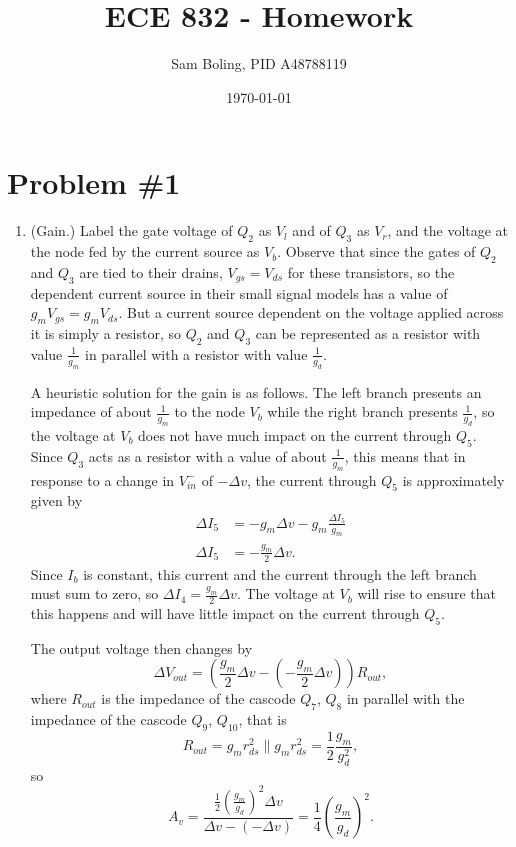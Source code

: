 \documentclass{article}
\title{ECE 832 - Homework}
\author{Sam Boling, PID A48788119}
\date{\today}
\begin{document}
\maketitle

\section*{Problem \#1}

\begin{enumerate}
\item{ (Gain.)
Label the gate voltage of $Q_2$ as $V_l$ and of $Q_3$ as $V_r$, and the
voltage at the node fed by the current source as $V_b$. Observe that since
the gates of $Q_2$ and $Q_3$ are tied to their drains, $V_{gs} = V_{ds}$ for
these transistors, so the dependent current source in their small signal models
has a value of $g_m V_{gs} = g_m V_{ds}$. But a current source dependent on the
voltage applied across it is simply a resistor, so $Q_2$ and $Q_3$ can be 
represented as a resistor with value $\frac{1}{g_m}$ in parallel with a 
resistor with value $\frac{1}{g_d}$.

A heuristic solution for the gain is as follows. The left branch presents an
impedance of about $\frac{1}{g_m}$ to the node $V_{b}$ while the right branch
presents $\frac{1}{g_d}$, so the voltage at $V_{b}$ does not have much impact
on the current through $Q_5$. Since $Q_3$ acts as a resistor with a value of
about $\frac{1}{g_m}$, this means that in response to a change in $V_{in}^{-}$
of $-\Delta v$, the current through $Q_5$ is approximately given by
\begin{align*}
\Delta I_5 &= -g_m \Delta v - g_m \frac{\Delta I_5}{g_m} \\
\Delta I_5 &= -\frac{g_m}{2} \Delta v.
\end{align*}
Since $I_b$ is constant, this current and the current through the left branch
must sum to zero, so $\Delta I_4 = \frac{g_m}{2} \Delta v$. The voltage at
$V_b$ will rise to ensure that this happens and will have little impact on
the current through $Q_5$.

The output voltage then changes by 
$$
\Delta V_{out} = \left(\frac{g_m}{2} \Delta v 
                 - \left(-\frac{g_m}{2} \Delta v\right)\right)R_{out},
$$
where $R_{out}$ is the impedance of the cascode $Q_7$, $Q_8$ in parallel
with the impedance of the cascode $Q_9$, $Q_{10}$, that is
$$
R_{out} = g_m r_{ds}^2 \| g_m r_{ds}^2 
        = \frac{1}{2} \frac{g_m}{g_d^2},
$$
so
$$
A_v = \frac{\frac{1}{2}\left(\frac{g_m}{g_d}\right)^2 \Delta v}
           {\Delta v - (- \Delta v)} 
    = \frac{1}{4} \left(\frac{g_m}{g_d}\right)^2.
$$

}
\end{enumerate}
\end{document}
